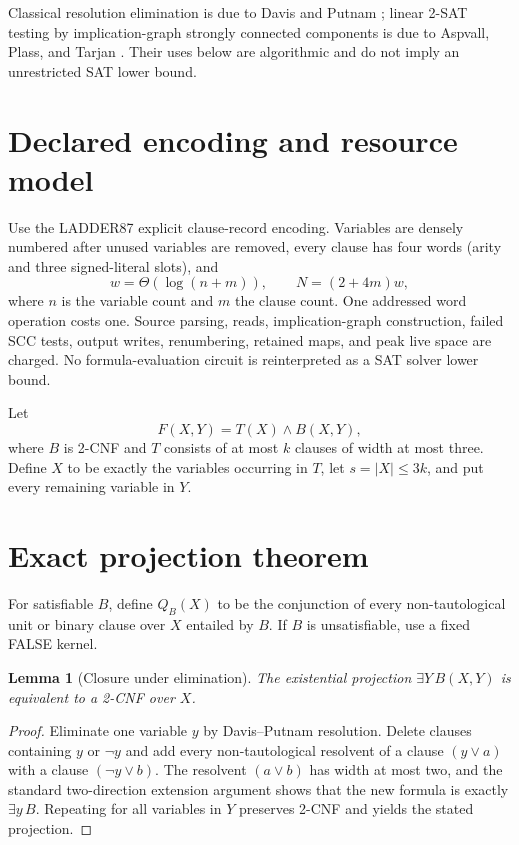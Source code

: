 \documentclass[11pt]{article}
\newtheorem{lemma}{Lemma}
\begin{document}
Classical resolution elimination is due to Davis and Putnam \cite{DP}; linear
2-SAT testing by implication-graph strongly connected components is due to
Aspvall, Plass, and Tarjan \cite{APT}.  Their uses below are algorithmic and do
not imply an unrestricted SAT lower bound.

\section{Declared encoding and resource model}
Use the LADDER87 explicit clause-record encoding.  Variables are densely
numbered after unused variables are removed, every clause has four words
(arity and three signed-literal slots), and
\[
  w=\Theta(\log(n+m)),\qquad N=(2+4m)w,
\]
where $n$ is the variable count and $m$ the clause count.  One addressed word
operation costs one.  Source parsing, reads, implication-graph construction,
failed SCC tests, output writes, renumbering, retained maps, and peak live
space are charged.  No formula-evaluation circuit is reinterpreted as a SAT
solver lower bound.

Let
\[
 F(X,Y)=T(X)\wedge B(X,Y),
\]
where $B$ is 2-CNF and $T$ consists of at most $k$ clauses of width at most
three.  Define $X$ to be exactly the variables occurring in $T$, let
$s=|X|\le3k$, and put every remaining variable in $Y$.

\section{Exact projection theorem}
For satisfiable $B$, define $Q_B(X)$ to be the conjunction of every
non-tautological unit or binary clause over $X$ entailed by $B$.  If $B$ is
unsatisfiable, use a fixed FALSE kernel.

\begin{lemma}[Closure under elimination]\label{lem:closure}
The existential projection $\exists Y\,B(X,Y)$ is equivalent to a 2-CNF over
$X$.
\end{lemma}
\begin{proof}
Eliminate one variable $y$ by Davis--Putnam resolution.  Delete clauses
containing $y$ or $\neg y$ and add every non-tautological resolvent of a
clause $(y\vee a)$ with a clause $(\neg y\vee b)$.  The resolvent
$(a\vee b)$ has width at most two, and the standard two-direction extension
argument shows that the new formula is exactly $\exists y\,B$.  Repeating for
all variables in $Y$ preserves 2-CNF and yields the stated projection.
\end{proof}
\end{document}
